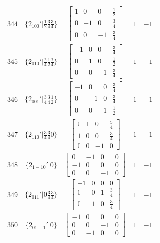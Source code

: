 \documentclass[fleqn,8pt]{jsarticle}
\begin{document}
\begin{longtable}{ccccc}
$ 344 $ & $ \{2{}_{100}{}'|\frac{1}{2} \frac{3}{4} \frac{3}{4}\} $ & $ \begin{bmatrix} 1 & 0 & 0 & \frac{1}{2} \\ 0 & -1 & 0 & \frac{3}{4} \\ 0 & 0 & -1 & \frac{3}{4} \end{bmatrix} $ & $ 1 $ & $ -1 $ \\ \hline
$ 345 $ & $ \{2{}_{010}{}'|\frac{3}{4} \frac{1}{2} \frac{3}{4}\} $ & $ \begin{bmatrix} -1 & 0 & 0 & \frac{3}{4} \\ 0 & 1 & 0 & \frac{1}{2} \\ 0 & 0 & -1 & \frac{3}{4} \end{bmatrix} $ & $ 1 $ & $ -1 $ \\ \hline
$ 346 $ & $ \{2{}_{001}{}'|\frac{3}{4} \frac{3}{4} \frac{1}{2}\} $ & $ \begin{bmatrix} -1 & 0 & 0 & \frac{3}{4} \\ 0 & -1 & 0 & \frac{3}{4} \\ 0 & 0 & 1 & \frac{1}{2} \end{bmatrix} $ & $ 1 $ & $ -1 $ \\ \hline
$ 347 $ & $ \{2{}_{110}{}'|\frac{3}{4} \frac{3}{4} 0\} $ & $ \begin{bmatrix} 0 & 1 & 0 & \frac{3}{4} \\ 1 & 0 & 0 & \frac{3}{4} \\ 0 & 0 & -1 & 0 \end{bmatrix} $ & $ 1 $ & $ -1 $ \\ \hline
$ 348 $ & $ \{2{}_{1-10}{}'|0\} $ & $ \begin{bmatrix} 0 & -1 & 0 & 0 \\ -1 & 0 & 0 & 0 \\ 0 & 0 & -1 & 0 \end{bmatrix} $ & $ 1 $ & $ -1 $ \\ \hline
$ 349 $ & $ \{2{}_{011}{}'|0 \frac{3}{4} \frac{3}{4}\} $ & $ \begin{bmatrix} -1 & 0 & 0 & 0 \\ 0 & 0 & 1 & \frac{3}{4} \\ 0 & 1 & 0 & \frac{3}{4} \end{bmatrix} $ & $ 1 $ & $ -1 $ \\ \hline
$ 350 $ & $ \{2{}_{01-1}{}'|0\} $ & $ \begin{bmatrix} -1 & 0 & 0 & 0 \\ 0 & 0 & -1 & 0 \\ 0 & -1 & 0 & 0 \end{bmatrix} $ & $ 1 $ & $ -1 $ \\ \hline

\end{longtable}
\end{document}
